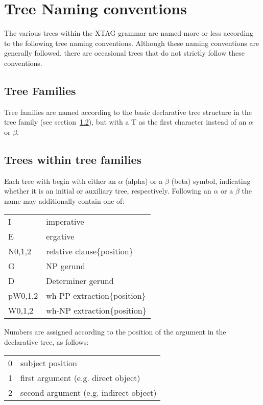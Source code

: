 \chapter{Tree Naming conventions}
\label{tree-naming}

The various trees within the XTAG grammar are named more or less according to
the following tree naming conventions.  Although these naming conventions are
generally followed, there are occasional trees that do not strictly follow
these conventions.

\section{Tree Families}
Tree families are named according to the basic declarative tree structure in
the tree family (see section~\ref{family-trees}), but with a T as the first
character instead of an $\alpha$ or $\beta$.

\section{Trees within tree families}
\label{family-trees}

Each tree with begin with either an $\alpha$ (alpha) or a $\beta$ (beta)
symbol, indicating whether it is an initial or auxiliary tree, respectively.
Following an $\alpha$ or a $\beta$ the name may additionally contain one of:

\begin{description}
\item\begin{tabular}{ll}
I&imperative\\
E&ergative\\
N{0,1,2}&relative clause\{position\}\\
G&NP gerund\\
D&Determiner gerund\\
pW{0,1,2}&wh-PP extraction\{position\}\\
W{0,1,2}&wh-NP extraction\{position\}\\
\end{tabular}
\end{description}

\noindent Numbers are assigned according to the position of the argument in the
declarative tree, as follows:

\begin{description}
\item\begin{tabular}{ll}
0&subject position\\
1&first argument (e.g. direct object)\\
2&second argument (e.g. indirect object)\\
\end{tabular}
\end{description}

